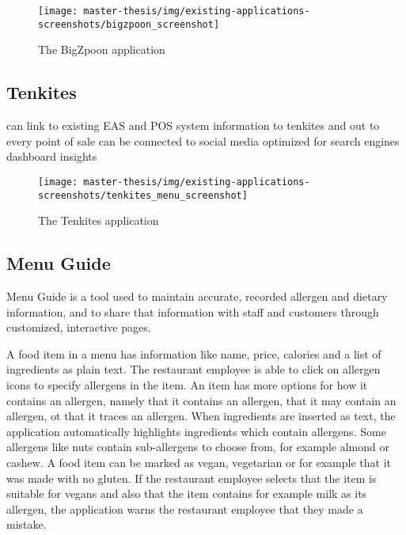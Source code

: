   \begin{figure}[h]
    \centering
    \texttt{[image: master-thesis/img/existing-applications-screenshots/bigzpoon\_screenshot]}
    \caption{The BigZpoon application}
  \end{figure}

\newpage

\subsection*{Tenkites}
  can link to existing EAS and POS system
  information to tenkites and out to every point of sale
  can be connected to social media
  optimized for search engines
  dashboard insights

  \begin{figure}[h]
    \centering
    \texttt{[image: master-thesis/img/existing-applications-screenshots/tenkites\_menu\_screenshot]}
    \caption{The Tenkites application}
  \end{figure}

\subsection*{Menu Guide}
  Menu Guide is a tool used to maintain accurate, recorded allergen and dietary information, and to share that information with staff and customers through customized, interactive pages.


  A food item in a menu has information like name, price, calories and a list of ingredients as plain text.
  The restaurant employee is able to click on allergen icons to specify allergens in the item.
  An item has more options for how it contains an allergen, namely that it contains an allergen, that it may contain an allergen, ot that it traces an allergen.
  When ingredients are inserted as text, the application automatically highlights ingredients which contain allergens.
  Some allergens like nuts contain sub-allergens to choose from, for example almond or cashew.
  A food item can be marked as vegan, vegetarian or for example that it was made with no gluten.
  If the restaurant employee selects that the item is suitable for vegans and also that the item contains for example milk as its allergen, the application warns the restaurant employee that they made a mistake.

